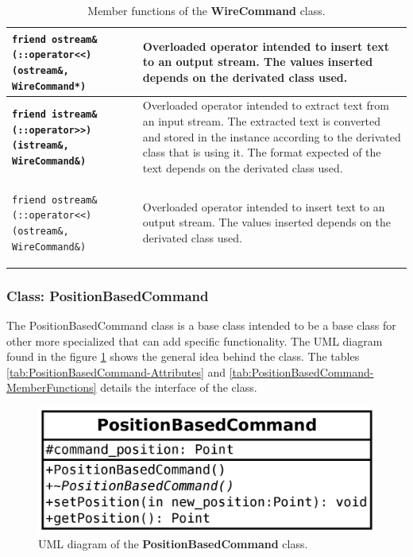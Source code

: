 \documentclass[11pt,twoside,openany,x11names,svgnames]{memoir}
\begin{document}
\begin{table}[h]
\begin{tabular}{| >{\bfseries}p{7.5cm} | p{8cm} |}
	\hline
	
	\texttt{friend ostream\& (::operator<<) (ostream\&, WireCommand*)} & Overloaded operator intended to insert text to an output stream. The values inserted depends on the derivated class used. \\
	
	\hline
	
	\texttt{friend istream\& (::operator>>) (istream\&, WireCommand\&)} & Overloaded operator intended to extract text from an input stream. The extracted text is converted and stored in the instance according to the derivated class that is using it. The format expected of the text depends on the derivated class used. \\
	
	\hline
	
	\texttt{friend ostream\& (::operator<<) (ostream\&, WireCommand\&)} & Overloaded operator intended to insert text to an output stream. The values inserted depends on the derivated class used. \\
	
	\hline
\end{tabular}
\caption{Member functions of the \textbf{WireCommand} class.}
\label{tab:WireCommand-MemberFunctions}
\end{table}

\clearpage

\subsubsection{Class: PositionBasedCommand}\label{Class-PositionBasedCommand}

The PositionBasedCommand class is a base class intended to be a base class for other more specialized that can add specific functionality. The UML diagram found in the figure \ref{fig:class-position-based-command} shows the general idea behind the class. The tables \ref{tab:PositionBasedCommand-Attributes} and \ref{tab:PositionBasedCommand-MemberFunctions} details the interface of the class.

\begin{figure}
	\centering
	\includegraphics[scale=0.2, clip=true, trim= 0pt 0pt 0pt 0pt]{images/chapter03-image21}
	\caption{UML diagram of the \textbf{PositionBasedCommand} class.}
	\label{fig:class-position-based-command}
\end{figure}
\end{document}
